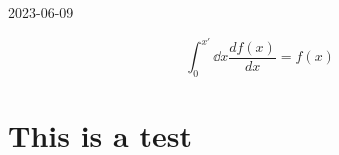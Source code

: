 


2023-06-09

\[ \int_{0}^{x'}\dd x \frac{d {f(x)}}{d {x}} = f(x) \]

\section*{This is a test}




